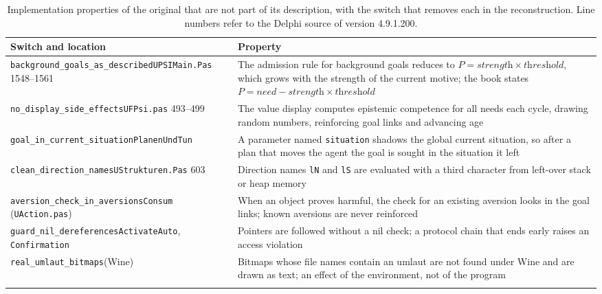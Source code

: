 \documentclass[preprint,12pt,authoryear]{elsarticle}
\newcommand{\code}[1]{\texttt{#1}}
\begin{document}
\begin{table}[t]
\centering
\caption{Implementation properties of the original that are not part of its description, with the switch that removes each in the reconstruction. Line numbers refer to the Delphi source of version 4.9.1.200.}
\label{tab:artefacts}
\footnotesize
\begin{tabularx}{\textwidth}{L{0.33\textwidth} Y}
\toprule
Switch and location & Property \\
\midrule
\code{background\_goals\_as\_}\newline\code{described}\newline\code{UPSIMain.Pas} 1548--1561 & The admission rule for background goals reduces to $P = \textit{strength} \times \textit{threshold}$, which grows with the strength of the current motive; the book states $P = \textit{need} - \textit{strength} \times \textit{threshold}$ \\ \addlinespace
\code{no\_display\_side\_effects}\newline\code{UFPsi.pas} 493--499 & The value display computes epistemic competence for all needs each cycle, drawing random numbers, reinforcing goal links and advancing age \\ \addlinespace
\code{goal\_in\_current\_situation}\newline\code{PlanenUndTun} & A parameter named \code{situation} shadows the global current situation, so after a plan that moves the agent the goal is sought in the situation it left \\ \addlinespace
\code{clean\_direction\_names}\newline\code{UStrukturen.Pas} 603 & Direction names \code{lN} and \code{lS} are evaluated with a third character from left-over stack or heap memory \\ \addlinespace
\code{aversion\_check\_in\_aversions}\newline\code{Consum} (\code{UAction.pas}) & When an object proves harmful, the check for an existing aversion looks in the goal links; known aversions are never reinforced \\ \addlinespace
\code{guard\_nil\_dereferences}\newline\code{ActivateAuto}, \code{Confirmation} & Pointers are followed without a nil check; a protocol chain that ends early raises an access violation \\ \addlinespace
\code{real\_umlaut\_bitmaps}\newline(Wine) & Bitmaps whose file names contain an umlaut are not found under Wine and are drawn as text; an effect of the environment, not of the program \\ \addlinespace
\bottomrule
\end{tabularx}
\end{table}
\end{document}

